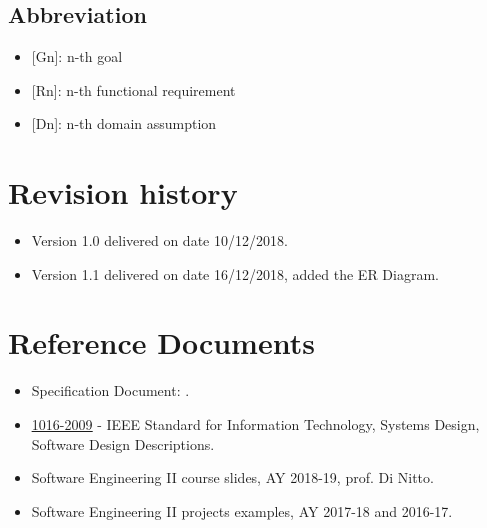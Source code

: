 \subsection{Abbreviation}
\begin{itemize}
    \item {[Gn]}: n-th goal
    \item {[Rn]}: n-th functional requirement
    \item {[Dn]}: n-th domain assumption
\end{itemize}

\section{Revision history}
\begin{itemize}
    \item Version 1.0 delivered on date 10/12/2018.
    \item Version 1.1 delivered on date 16/12/2018, added the ER Diagram.
\end{itemize}

\section{Reference Documents}
\begin{itemize}
    \item Specification Document: . 
    \item \href{https://ieeexplore.ieee.org/document/5167255} {\underline{1016-2009}} - IEEE Standard for Information Technology, Systems Design, Software Design Descriptions.
    \item Software Engineering II course slides, AY 2018-19, prof. Di Nitto.
    \item Software Engineering II projects examples, AY 2017-18 and 2016-17.
\end{itemize}

